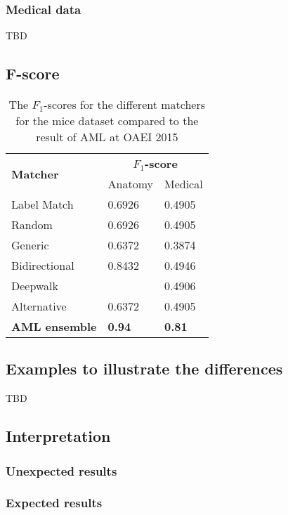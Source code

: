 \documentclass{article}
\begin{document}
   \subsubsection{Medical data}
   TBD
  
  \subsection{F-score}
  \begin{table}[H]
  \caption[$F_1$ mice]{The $F_1$-scores for the different matchers for the mice dataset compared to the result of AML at OAEI 2015 \cite{oaei2015}}
  \label{fscores}
  \begin{tabular}{l|ll}
  \multirow{2}{*}{\textbf{Matcher}} & \multicolumn{2}{c}{\textbf{$F_1$-score}} \\
  & Anatomy & Medical\\
  \hline
  Label Match & 0.6926 & 0.4905 \\
  Random & 0.6926 & 0.4905 \\
  Generic & 0.6372 & 0.3874 \\
  Bidirectional & 0.8432 & 0.4946 \\
  Deepwalk &  & 0.4906 \\
  Alternative & 0.6372 & 0.4905 \\
  \textbf{AML ensemble} & \textbf{0.94} & \textbf{0.81} \\ %
  \end{tabular}
  \end{table}
  \subsection{Examples to illustrate the differences}
  TBD
   
 \newpage
 \subsection{Interpretation}
 \subsubsection{Unexpected results}
 \subsubsection{Expected results}
  
\end{document}
